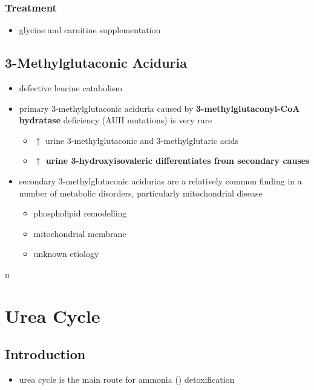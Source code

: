 \documentclass[12pt]{scrartcl}
\begin{document}
\subsubsection{Treatment}
\label{sec:orgdf191f4}
\begin{itemize}
\item glycine and carnitine supplementation
\end{itemize}

\subsection{3-Methylglutaconic Aciduria}
\label{sec:org87bbcc2}
\begin{itemize}
\item defective leucine catabolism
\item primary 3-methylglutaconic aciduria caused by \textbf{3-methylglutaconyl-CoA}
\textbf{hydratase} deficiency (AUH mutations) is very rare
\begin{itemize}
\item \(\uparrow\) urine 3-methylglutaconic and 3-methylglutaric acids
\item \textbf{\(\uparrow\) urine 3-hydroxyisovaleric differentiates from secondary causes}
\end{itemize}
\end{itemize}


\begin{itemize}
\item secondary 3-methylglutaconic acidurias are a relatively common finding in a
number of metabolic disorders, particularly mitochondrial disease
\begin{itemize}
\item phospholipid remodelling
\item mitochondrial membrane
\item unknown etiology
\end{itemize}
\end{itemize}
n

\section{Urea Cycle}
\label{sec:orgcca0a54}
\subsection{Introduction}
\label{sec:org878e566}
\begin{itemize}
\item urea cycle is the main route for ammonia () detoxification
\end{itemize}
\end{document}
